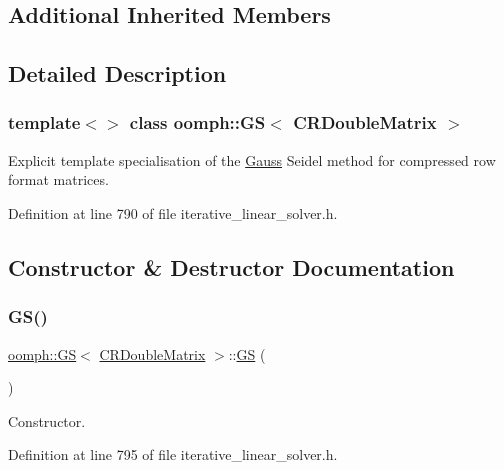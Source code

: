 \subsection*{Additional Inherited Members}


\subsection{Detailed Description}
\subsubsection*{template$<$$>$\newline
class oomph\+::\+G\+S$<$ C\+R\+Double\+Matrix $>$}

Explicit template specialisation of the \hyperlink{classoomph_1_1Gauss}{Gauss} Seidel method for compressed row format matrices. 

Definition at line 790 of file iterative\+\_\+linear\+\_\+solver.\+h.



\subsection{Constructor \& Destructor Documentation}
\mbox{\label{classoomph_1_1GS_3_01CRDoubleMatrix_01_4_a230c2d26d23fb9c0704581c1b2da5e59}} 
\subsubsection{\texorpdfstring{G\+S()}{GS()}\hspace{0.1cm}{\footnotesize\ttfamily [1/2]}}
{\footnotesize\ttfamily \hyperlink{classoomph_1_1GS}{oomph\+::\+GS}$<$ \hyperlink{classoomph_1_1CRDoubleMatrix}{C\+R\+Double\+Matrix} $>$\+::\hyperlink{classoomph_1_1GS}{GS} (\begin{DoxyParamCaption}{ }\end{DoxyParamCaption})\hspace{0.3cm}{\ttfamily [inline]}}



Constructor. 



Definition at line 795 of file iterative\+\_\+linear\+\_\+solver.\+h.

